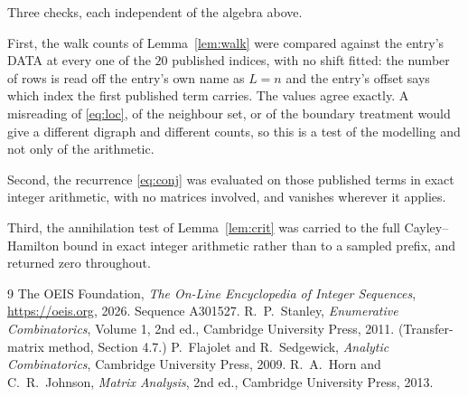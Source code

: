 \documentclass[11pt,a4paper]{article}
\theoremstyle{plain}
\theoremstyle{definition}
\begin{document}
Three checks, each independent of the algebra above.

First, the walk counts of Lemma~\ref{lem:walk} were compared against the entry's DATA at
every one of the $20$ published indices, with no shift fitted: the number of rows is
read off the entry's own name as $L=n$ and the entry's offset says which index the first
published term carries. The values agree exactly. A misreading of \eqref{eq:loc}, of the
neighbour set, or of the boundary treatment would give a different digraph and different
counts, so this is a test of the modelling and not only of the arithmetic.

Second, the recurrence \eqref{eq:conj} was evaluated on those published terms in exact
integer arithmetic, with no matrices involved, and vanishes wherever it applies.

Third, the annihilation test of Lemma~\ref{lem:crit} was carried to the full
Cayley--Hamilton bound in exact integer arithmetic rather than to a sampled prefix, and
returned zero throughout.

\begin{thebibliography}{9}
 The OEIS Foundation, \emph{The On-Line Encyclopedia of Integer
Sequences}, \url{https://oeis.org}, 2026. Sequence A301527.
 R.~P.~Stanley, \emph{Enumerative Combinatorics}, Volume 1, 2nd ed.,
Cambridge University Press, 2011. (Transfer-matrix method, Section 4.7.)
 P.~Flajolet and R.~Sedgewick, \emph{Analytic Combinatorics}, Cambridge
University Press, 2009.
 R.~A.~Horn and C.~R.~Johnson, \emph{Matrix Analysis}, 2nd ed., Cambridge
University Press, 2013.
\end{thebibliography}
\end{document}
